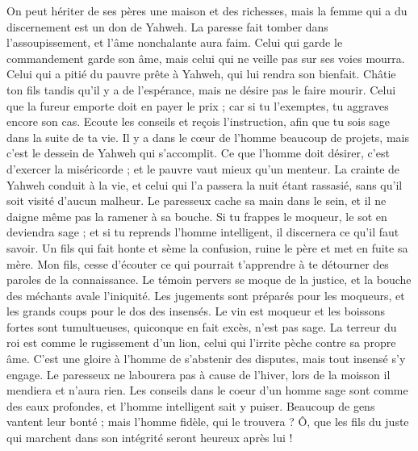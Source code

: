 \begin{multicols}{2}
On peut hériter de ses pères une maison et des richesses, mais la femme qui a du discernement est un don de Yahweh.
La paresse fait tomber dans l’assoupissement, et l'âme nonchalante aura faim.
Celui qui garde le commandement garde son âme, mais celui qui ne veille pas sur ses voies mourra.
Celui qui a pitié du pauvre prête à Yahweh, qui lui rendra son bienfait.
Châtie ton fils tandis qu'il y a de l'espérance, mais ne désire pas le faire mourir.
Celui que la fureur emporte doit en payer le prix ; car si tu l'exemptes, tu aggraves encore son cas.
Ecoute les conseils et reçois l'instruction, afin que tu sois sage dans la suite de ta vie.
Il y a dans le cœur de l’homme beaucoup de projets, mais c’est le dessein de Yahweh qui s’accomplit.
Ce que l'homme doit désirer, c'est d'exercer la miséricorde ; et le pauvre vaut mieux qu’un menteur.
La crainte de Yahweh conduit à la vie, et celui qui l'a passera la nuit étant rassasié, sans qu'il soit visité d'aucun malheur.
Le paresseux cache sa main dans le sein, et il ne daigne même pas la ramener à sa bouche.
Si tu frappes le moqueur, le sot en deviendra sage ; et si tu reprends l'homme intelligent, il discernera ce qu'il faut savoir.
Un fils qui fait honte et sème la confusion, ruine le père et met en fuite sa mère.
Mon fils, cesse d’écouter ce qui pourrait t’apprendre à te détourner des paroles de la connaissance.
Le témoin pervers se moque de la justice, et la bouche des méchants avale l'iniquité.
Les jugements sont préparés pour les moqueurs, et les grands coups pour le dos des insensés.
\VerseOne{}Le vin est moqueur et les boissons fortes sont tumultueuses, quiconque en fait excès, n'est pas sage.
La terreur du roi est comme le rugissement d'un lion, celui qui l’irrite pèche contre sa propre âme.
C'est une gloire à l'homme de s'abstenir des disputes, mais tout insensé s'y engage.
Le paresseux ne labourera pas à cause de l’hiver, lors de la moisson il mendiera et n'aura rien.
Les conseils dans le coeur d'un homme sage sont comme des eaux profondes, et l'homme intelligent sait y puiser.
Beaucoup de gens vantent leur bonté ; mais l’homme fidèle, qui le trouvera ?
Ô, que les fils du juste qui marchent dans son intégrité seront heureux après lui !

\end{multicols}
